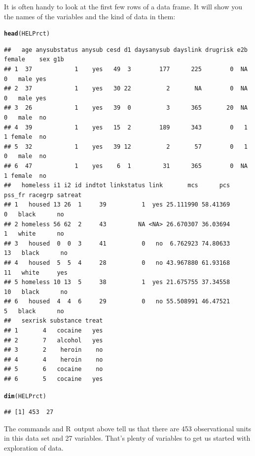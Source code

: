 \documentclass[twoside]{book}\usepackage[]{graphicx}\usepackage[]{xcolor}
\makeatletter
\newcommand{\hlstd}[1]{\textcolor[rgb]{0.345,0.345,0.345}{#1}}%
\newcommand{\hlkwd}[1]{\textcolor[rgb]{0.737,0.353,0.396}{\textbf{#1}}}%
\newenvironment{kframe}{%
 \def\at@end@of@kframe{}%
 \ifinner\ifhmode%
  \def\at@end@of@kframe{\end{minipage}}%
  \begin{minipage}{\columnwidth}%
 \fi\fi%
 \def\FrameCommand##1{\hskip\@totalleftmargin \hskip-\fboxsep
 \colorbox{shadecolor}{##1}\hskip-\fboxsep
     \hskip-\linewidth \hskip-\@totalleftmargin \hskip\columnwidth}%
 \MakeFramed {\advance\hsize-\width
   \@totalleftmargin\z@ \linewidth\hsize
   \@setminipage}}%
 {\par\unskip\endMakeFramed%
 \at@end@of@kframe}
\newenvironment{knitrout}{}{} %
\def\R{{\sf R}}
\makeatother
\begin{document}
It is often handy to look at the first few rows of a data frame.  It will
show you the names of the variables and the kind of data in them:
\begin{knitrout}
\color{fgcolor}\begin{kframe}
\begin{alltt}
\hlkwd{head}\hlstd{(HELPrct)}
\end{alltt}
\begin{verbatim}
##   age anysubstatus anysub cesd d1 daysanysub dayslink drugrisk e2b female    sex g1b
## 1  37            1    yes   49  3        177      225        0  NA      0   male yes
## 2  37            1    yes   30 22          2       NA        0  NA      0   male yes
## 3  26            1    yes   39  0          3      365       20  NA      0   male  no
## 4  39            1    yes   15  2        189      343        0   1      1 female  no
## 5  32            1    yes   39 12          2       57        0   1      0   male  no
## 6  47            1    yes    6  1         31      365        0  NA      1 female  no
##   homeless i1 i2 id indtot linkstatus link       mcs      pcs pss_fr racegrp satreat
## 1   housed 13 26  1     39          1  yes 25.111990 58.41369      0   black      no
## 2 homeless 56 62  2     43         NA <NA> 26.670307 36.03694      1   white      no
## 3   housed  0  0  3     41          0   no  6.762923 74.80633     13   black      no
## 4   housed  5  5  4     28          0   no 43.967880 61.93168     11   white     yes
## 5 homeless 10 13  5     38          1  yes 21.675755 37.34558     10   black      no
## 6   housed  4  4  6     29          0   no 55.508991 46.47521      5   black      no
##   sexrisk substance treat
## 1       4   cocaine   yes
## 2       7   alcohol   yes
## 3       2    heroin    no
## 4       4    heroin    no
## 5       6   cocaine    no
## 6       5   cocaine   yes
\end{verbatim}
\begin{alltt}
\hlkwd{dim}\hlstd{(HELPrct)}
\end{alltt}
\begin{verbatim}
## [1] 453  27
\end{verbatim}
\end{kframe}
\end{knitrout}
The commands and \R\ output above tell us that there are 453 observational
units in this data set and 27 variables.
That's plenty of variables to get us started with exploration of data.
\end{document}
